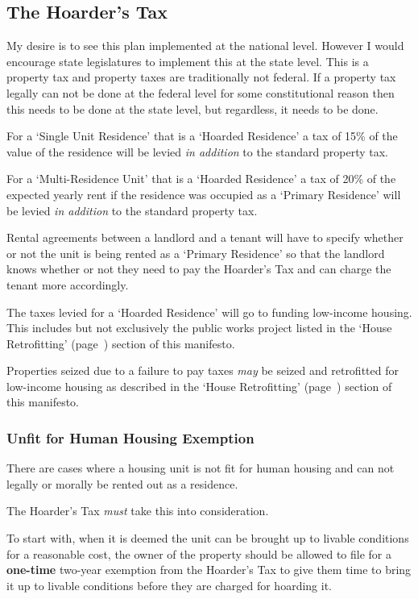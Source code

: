 \subsection{The Hoarder's Tax}
My desire is to see this plan implemented at the national level. However I would encourage state legislatures to implement this at the state level. This is a property tax and property taxes are traditionally not federal. If a property tax legally can not be done at the federal level for some constitutional reason then this needs to be done at the state level, but regardless, it needs to be done.

For a `Single Unit Residence' that is a `Hoarded Residence' a tax of 15\% of the value of the residence will be levied \emph{in addition} to the standard property tax.

For a `Multi-Residence Unit' that is a `Hoarded Residence' a tax of 20\% of the expected yearly rent if the residence was occupied as a `Primary Residence' will be levied \emph{in addition} to the standard property tax.

Rental agreements between a landlord and a tenant will have to specify whether or not the unit is being rented as a `Primary Residence' so that the landlord knows whether or not they need to pay the Hoarder's Tax and can charge the tenant more accordingly.

The taxes levied for a `Hoarded Residence' will go to funding low-income housing. This includes but not exclusively the public works project listed in the `House Retrofitting' (page~\pageref{retrofit}) section of this manifesto.

Properties seized due to a failure to pay taxes \emph{may} be seized and retrofitted for low-income housing as described in the `House Retrofitting' (page~\pageref{retrofit}) section of this manifesto.

\subsubsection{Unfit for Human Housing Exemption}

There are cases where a housing unit is not fit for human housing and can not legally or morally be rented out as a residence.

The Hoarder's Tax \emph{must} take this into consideration.

To start with, when it is deemed the unit can be brought up to livable conditions for a reasonable cost, the owner of the property should be allowed to file for a \textbf{one-time} two-year exemption from the Hoarder's Tax to give them time to bring it up to livable conditions before they are charged for hoarding it.


